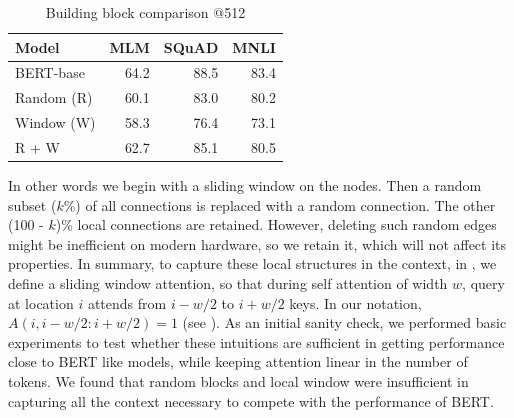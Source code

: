 \begin{table}
    \vspace{-3mm}
    \centering
    \small
    \begin{tabular}{@{}lrrr@{}}
    \toprule
    Model &  MLM & SQuAD & MNLI \\
    \midrule
    BERT-base      &  64.2 & 88.5 & 83.4 \\
    Random (R)     &  60.1 & 83.0 & 80.2 \\
    Window (W)     &  58.3 & 76.4 & 73.1 \\
    R + W          &  62.7 & 85.1 & 80.5 \\
    \bottomrule
    \end{tabular}
    \caption{Building block comparison @512}
    \label{tab:init}
    \vspace{-2mm}
\end{table}
In other words we begin with a sliding window on the nodes.
Then a random subset ($k$\%) of all connections is replaced with a random connection. 
The other (100 - $k$)\% local connections are retained.
However, deleting such random edges might be inefficient on modern hardware, so we retain it, which will not affect its properties.
In summary, to capture these local structures in the context, in \bigb, we define a sliding window attention, so that during self attention of width $w$, query at location $i$ attends from $i-w/2$ to $i+w/2$ keys.
In our notation, $A(i, i-w/2:i+w/2) = 1$  (see ). 
As an initial sanity check, we performed basic experiments to test whether these intuitions are sufficient in getting performance close to BERT like models, while keeping attention linear in the number of tokens.
We found that random blocks and local window were insufficient in capturing all the context necessary to 
compete with the performance of BERT.

